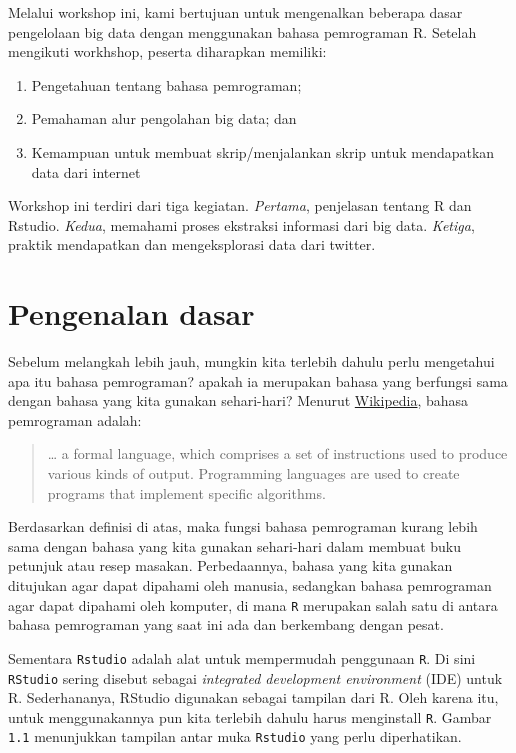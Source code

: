 \documentclass[]{book}
\providecommand{\tightlist}{%
  \setlength{\itemsep}{0pt}\setlength{\parskip}{0pt}}
\begin{document}
Melalui workshop ini, kami bertujuan untuk mengenalkan beberapa dasar
pengelolaan big data dengan menggunakan bahasa pemrograman R. Setelah
mengikuti workhshop, peserta diharapkan memiliki:

\begin{enumerate}
\def\labelenumi{\arabic{enumi}.}
\tightlist
\item
  Pengetahuan tentang bahasa pemrograman;
\item
  Pemahaman alur pengolahan big data; dan
\item
  Kemampuan untuk membuat skrip/menjalankan skrip untuk mendapatkan data
  dari internet
\end{enumerate}

Workshop ini terdiri dari tiga kegiatan. \emph{Pertama}, penjelasan
tentang R dan Rstudio. \emph{Kedua}, memahami proses ekstraksi informasi
dari big data. \emph{Ketiga}, praktik mendapatkan dan mengeksplorasi
data dari twitter.

\hypertarget{pengenalan-dasar}{%
\chapter{Pengenalan dasar}\label{pengenalan-dasar}}

Sebelum melangkah lebih jauh, mungkin kita terlebih dahulu perlu
mengetahui apa itu bahasa pemrograman? apakah ia merupakan bahasa yang
berfungsi sama dengan bahasa yang kita gunakan sehari-hari? Menurut
\href{https://en.wikipedia.org/wiki/Programming_language}{Wikipedia},
bahasa pemrograman adalah:

\begin{quote}
\ldots{} a formal language, which comprises a set of instructions used
to produce various kinds of output. Programming languages are used to
create programs that implement specific algorithms.
\end{quote}

Berdasarkan definisi di atas, maka fungsi bahasa pemrograman kurang
lebih sama dengan bahasa yang kita gunakan sehari-hari dalam membuat
buku petunjuk atau resep masakan. Perbedaannya, bahasa yang kita gunakan
ditujukan agar dapat dipahami oleh manusia, sedangkan bahasa pemrograman
agar dapat dipahami oleh komputer, di mana \texttt{R} merupakan salah
satu di antara bahasa pemrograman yang saat ini ada dan berkembang
dengan pesat.

Sementara \texttt{Rstudio} adalah alat untuk mempermudah penggunaan
\texttt{R}. Di sini \texttt{RStudio} sering disebut sebagai
\emph{integrated development environment} (IDE) untuk R. Sederhananya,
RStudio digunakan sebagai tampilan dari R. Oleh karena itu, untuk
menggunakannya pun kita terlebih dahulu harus menginstall \texttt{R}.
Gambar \texttt{1.1} menunjukkan tampilan antar muka \texttt{Rstudio}
yang perlu diperhatikan.
\end{document}
